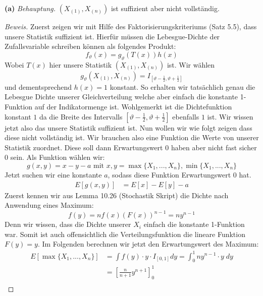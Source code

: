 \documentclass[a4paper]{article}
\newcommand{\beh}{\textit{Behauptung. }}
\newenvironment{Aufgabe}[2][Aufgabe]{\begin{trivlist}
\item[\hskip \labelsep {\bfseries #1}\hskip \labelsep {\bfseries #2.}]}{\end{trivlist}}
\begin{document}
\begin{theorem} %
\begin{Aufgabe}{2} %
\end{Aufgabe}

\textbf{(a)} 
\beh $(X_{(1)}, X_{(n)})$ ist suffizient aber nicht vollständig.

\begin{proof}[Beweis]
	Zuerst zeigen wir mit Hilfe des Faktorisierungskriteriums (Satz 5.5), dass unsere Statistik
	suffizient ist. Hierfür müssen die Lebesgue-Dichte der Zufallsvariable schreiben
	können als folgendes Produkt:
	\[
		f_\vartheta (x) = g_\vartheta (T(x)) h(x)
	\] 
	Wobei $T(x)$ hier unsere Statistik $(X_{(1)}, X_{(n)})$ ist. Wir wählen 
	\[
		g_\vartheta ( X_{(1)}, X_{(n)} ) = I_{ [
			\vartheta - \frac{ 1 }{ 2 }, \vartheta + \frac{ 1 }{ 2 }
		] }
	\]
	und dementsprechend $h(x) = 1$ konstant. So erhalten wir tatsächlich genau
	die Lebesgue Dichte unserer Gleichverteilung welche aber einfach die konstante
	1-Funktion auf der Indikatormenge ist. Wohlgemerkt ist die Dichtefunktion
	konstant $1$ da die Breite des Intervalls 
	$[\vartheta - \frac{ 1 }{ 2 }, \vartheta + \frac{ 1 }{ 2 }]$
	ebenfalls $1$ ist.
	Wir wissen jetzt also das unsere Statistik suffizient ist. Nun wollen wir wie folgt
	zeigen dass diese nicht vollständig ist. Wir brauchen also eine Funktion die Werte
	von unserer Statistik zuordnet. Diese soll dann Erwartungswert $0$ haben aber nicht
	fast sicher $0$ sein.
	Als Funktion wählen wir:
	\[
		g(x,y) = x - y - a \text{ mit } x, y = \max \{
			X_1, ..., X_n
		\}, \min \{
			X_1, ..., X_n
		\} 
	\]
	Jetzt suchen wir eine konstante $a$, sodass diese Funktion Erwartungswert $0$ hat.
	\begin{align*}
		E \left[
			g(x,y)
			\right] &= E \left[
			x
		\right] - E \left[
			y
		\right] - a
	\end{align*}
	Zuerst kennen wir aus Lemma 10.26 (Stochastik Skript) die Dichte nach Anwendung
	eines Maximum:
	\[
		f(y) = n f(x) (F(x)) ^{n-1}
		= n y ^{n-1}
	\] 
	Denn wir wissen, dass die Dichte unserer $X_i$ einfach die konstante 1-Funktion war.
	Somit ist auch offensichtlich die Verteilungsfunktion die lineare Funktion $F(y) = y$.
	Im Folgenden berechnen wir jetzt den Erwartungswert des Maximum:
	\begin{align*}
		E \left[
			\max \{
				X_1, ..., X_n
			\} 
		\right] &= \int f(y) \cdot y \cdot I_{[0,1]} dy 
		= \int_{0}^{1} n y ^{n-1} \cdot y \; dy \\
				&= \left[
					\frac{ n }{ n+1 } y ^{n+1}
				\right]_0^1 \\

\end{align*}
\end{proof}
\end{theorem}
\end{document}

